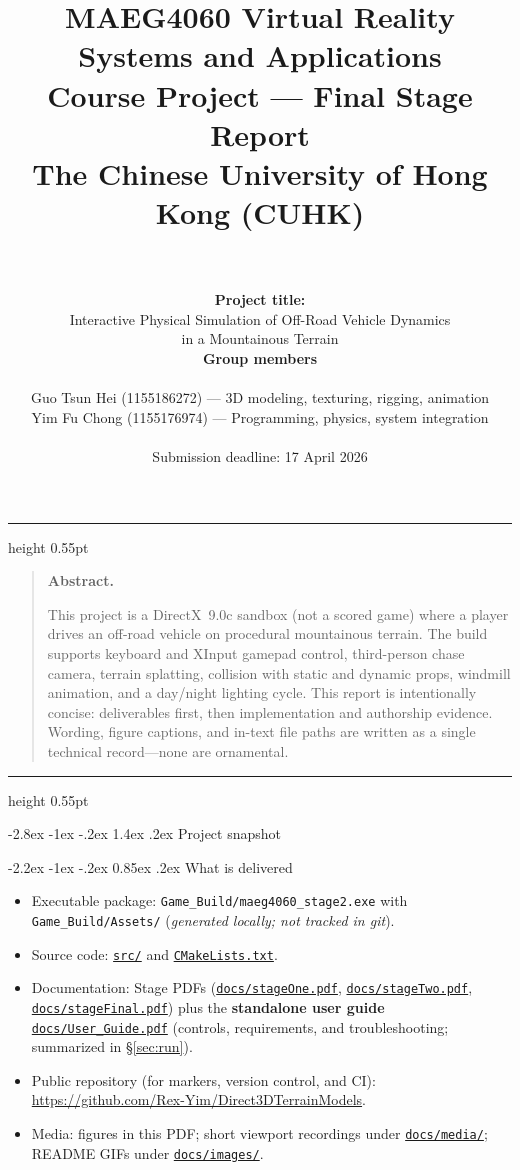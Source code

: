 \documentclass[11pt,a4paper]{article}
\title{%
  {\Large\bfseries\color{Brand}MAEG4060}\quad
  {\large\color{BrandLight}Virtual Reality Systems and Applications}\\[0.85em]
  {\Large Course Project --- Final Stage Report}\\[0.35em]
  {\normalsize\color{RuleGray}The Chinese University of Hong Kong (CUHK)}}
\author{%
  \begin{minipage}{0.92\linewidth}\centering
  \rule[0.5ex]{0.45\linewidth}{0.55pt}\\[0.85em]
  \textbf{Project title:}\\[0.25em]
  {\large Interactive Physical Simulation of Off-Road Vehicle Dynamics\\in a Mountainous Terrain}\\[1em]
  \textbf{Group members}\\[0.45em]
  \begin{tabular}{@{}c@{}}
    Guo Tsun Hei (1155186272) --- 3D modeling, texturing, rigging, animation\\[0.35em]
    Yim Fu Chong (1155176974) --- Programming, physics, system integration
  \end{tabular}\\[0.65em]
  \small\textcolor{RuleGray}{Submission deadline: 17 April 2026}
  \end{minipage}}
\date{}
\makeatletter
\newcommand{\gh}[2]{\href{https://github.com/Rex-Yim/Direct3DTerrainModels/blob/main/#1}{\texttt{#2}}}
\renewcommand\section{\@startsection{section}{1}{\z@}%
  {-2.8ex \@plus -1ex \@minus -.2ex}%
  {1.4ex \@plus .2ex}%
  {\reset@font\Large\bfseries\color{Brand}}}
\renewcommand\subsection{\@startsection{subsection}{2}{\z@}%
  {-2.2ex \@plus -1ex \@minus -.2ex}%
  {0.85ex \@plus .2ex}%
  {\reset@font\large\bfseries\color{BrandLight}}}
\newcommand{\sectionrule}{%
  \par\vspace{-0.35em}\noindent{\color{RuleGray}\rule{\linewidth}{0.55pt}}\par\vspace{0.6em}}
\newenvironment{reportabstract}{%
  \par\vspace{0.5em}%
  {\color{RuleGray}\hrule height 0.55pt}%
  \par\vspace{0.45em}%
  \begin{quotation}\small
  \noindent\textcolor{Brand}{\textbf{Abstract.}}\quad\ignorespaces
}{%
  \end{quotation}%
  \par\vspace{0.35em}%
  {\color{RuleGray}\hrule height 0.55pt}%
  \par\vspace{0.75em}%
}
\makeatother
\begin{document}
\renewcommand{\figurename}{\textcolor{Brand}{Figure}}
\maketitle
\thispagestyle{empty}
\vspace*{-1.5em}

\begin{reportabstract}
This project is a DirectX~9.0c sandbox (not a scored game) where a player drives an off-road vehicle on procedural mountainous terrain. The build supports keyboard and XInput gamepad control, third-person chase camera, terrain splatting, collision with static and dynamic props, windmill animation, and a day/night lighting cycle. This report is intentionally concise: deliverables first, then implementation and authorship evidence. Wording, figure captions, and in-text file paths are written as a single technical record---none are ornamental.
\end{reportabstract}

\tableofcontents
\newpage

\section{Project snapshot}\sectionrule
\label{sec:snapshot}

\subsection{What is delivered}
\begin{itemize}
  \item Executable package: \texttt{Game\_Build/maeg4060\_stage2.exe} with \texttt{Game\_Build/Assets/} (\emph{generated locally; not tracked in git}).
  \item Source code: \gh{src/}{src/} and \gh{CMakeLists.txt}{CMakeLists.txt}.
  \item Documentation: Stage PDFs (\gh{docs/stageOne.pdf}{docs/stageOne.pdf}, \gh{docs/stageTwo.pdf}{docs/stageTwo.pdf}, \gh{docs/stageFinal.pdf}{docs/stageFinal.pdf}) plus the \textbf{standalone user guide} \gh{docs/User\_Guide.pdf}{docs/User\_Guide.pdf} (controls, requirements, and troubleshooting; summarized in \S\ref{sec:run}).
  \item Public repository (for markers, version control, and CI):\newline
        {\small\url{https://github.com/Rex-Yim/Direct3DTerrainModels}}.
  \item Media: figures in this PDF; short viewport recordings under \gh{docs/media/}{docs/media/}; README GIFs under \gh{docs/images/}{docs/images/}.
\end{itemize}
\end{document}
